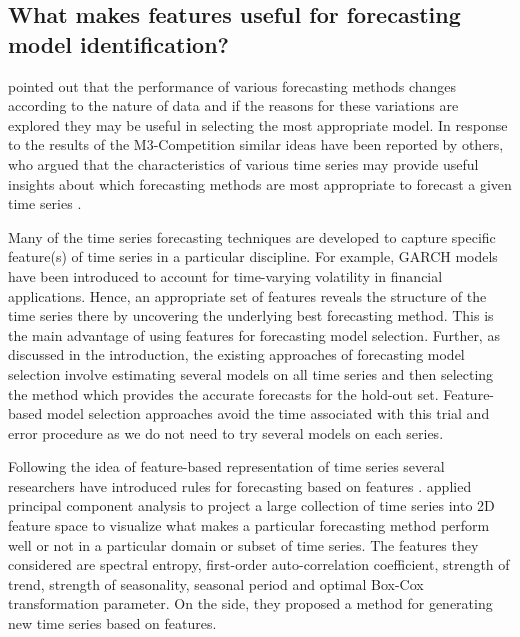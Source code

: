 \documentclass[11pt,a4paper,]{article}
\theoremstyle{definition}
\theoremstyle{definition}
\theoremstyle{definition}
\theoremstyle{remark}
\begin{document}
\subsection{What makes features useful for forecasting model
identification?}\label{what-makes-features-useful-for-forecasting-model-identification}

\textcite{reid1972comparison} pointed out that the performance of
various forecasting methods changes according to the nature of data and
if the reasons for these variations are explored they may be useful in
selecting the most appropriate model. In response to the results of the
M3-Competition \autocite{makridakis2000m3} similar ideas have been
reported by others, who argued that the characteristics of various time
series may provide useful insights about which forecasting methods are
most appropriate to forecast a given time series
\autocites{hyndman2001s}{lawrence2001s}{armstrong2001s}.

Many of the time series forecasting techniques are developed to capture
specific feature(s) of time series in a particular discipline. For
example, GARCH models have been introduced to account for time-varying
volatility in financial applications. Hence, an appropriate set of
features reveals the structure of the time series there by uncovering
the underlying best forecasting method. This is the main advantage of
using features for forecasting model selection. Further, as discussed in
the introduction, the existing approaches of forecasting model selection
involve estimating several models on all time series and then selecting
the method which provides the accurate forecasts for the hold-out set.
Feature-based model selection approaches avoid the time associated with
this trial and error procedure as we do not need to try several models
on each series.

Following the idea of feature-based representation of time series
several researchers have introduced rules for forecasting based on
features \autocites{collopy1992rule}{adya2001automatic}{wang2009rule}.
\textcite{kang2017visualising} applied principal component analysis to
project a large collection of time series into 2D feature space to
visualize what makes a particular forecasting method perform well or not
in a particular domain or subset of time series. The features they
considered are spectral entropy, first-order auto-correlation
coefficient, strength of trend, strength of seasonality, seasonal period
and optimal Box-Cox transformation parameter. On the side, they proposed
a method for generating new time series based on features.
\end{document}
